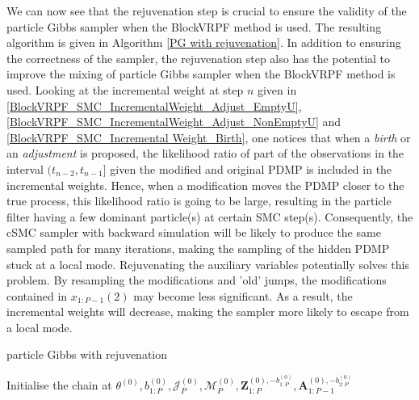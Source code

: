 \documentclass[12pt,a4paper]{article}
\begin{document}
We can now see that the rejuvenation step is crucial to ensure the validity of the particle Gibbs sampler when the BlockVRPF method is used. The resulting algorithm is given in Algorithm \ref{PG with rejuvenation}. In addition to ensuring the correctness of the sampler, the rejuvenation step also has the potential to improve the mixing of particle Gibbs sampler when the BlockVRPF method is used. Looking at the incremental weight at step \(n\) given in \eqref{BlockVRPF_SMC_IncrementalWeight_Adjust_EmptyU}, \eqref{BlockVRPF_SMC_IncrementalWeight_Adjust_NonEmptyU} and \eqref{BlockVRPF_SMC_Incremental Weight_Birth}, one notices that when a \textit{birth} or an \textit{adjustment} is proposed, the likelihood ratio of part of the observations in the interval \((t_{n-2},t_{n-1}]\) given the modified and original PDMP is included in the incremental weights. Hence, when a modification moves the PDMP closer to the true process, this likelihood ratio is going to be large, resulting in the particle filter having a few dominant particle(s) at certain SMC step(s). Consequently, the cSMC sampler with backward simulation will be likely to produce the same sampled path for many iterations, making the sampling of the hidden PDMP stuck at a local mode. Rejuvenating the auxiliary variables potentially solves this problem. By resampling the modifications and 'old' jumps, the modifications contained in \(x_{1:P-1}(2)\) may become less significant. As a result, the incremental weights will decrease, making the sampler more likely to escape from a local mode. 

\begin{algorithm}
    \caption{particle Gibbs with rejuvenation}\label{PG with rejuvenation}
    Initialise the chain at \(\theta^{(0)},b_{1:P}^{(0)},\mathcal{J}_P^{(0)},\mathcal{M}_P^{(0)},\mathbf{Z}_{1:P}^{(0),-b_{1:P}^{(0)}},\mathbf{A}_{1:P-1}^{(0),-b_{2:P}^{(0)}}\)\;
\end{algorithm}
\end{document}
